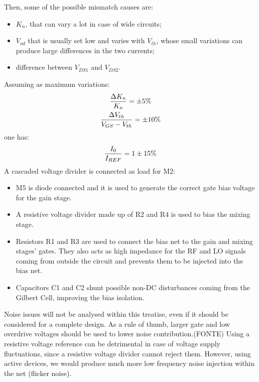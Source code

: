 Then, some of the possible mismatch causes are:
\begin{itemize}
	\item $K_n$, that can vary a lot in case of wide circuits;
	\item $V_{od}$ that is usually set low and varies with $V_{th}$, whose small variations can produce large differences in the two currents;
	\item difference between $V_{DS1}$ and $V_{DS2}$.
\end{itemize}
Assuming as maximum variations:
\begin{gather}
\frac{\Delta K_n}{K_n} = \pm 5 \% \notag \\
\frac{\Delta V_{th}}{V_{GS}-V_{th}} = \pm 10 \% \notag
\end{gather}
one has:
\begin{equation}
\frac{I_0}{I_{REF}} = 1 \pm 15 \% \notag
\end{equation}
A cascaded voltage divider is connected as load for M2: 
\begin{itemize}
	\item M5 is diode connected and it is used to generate the correct gate bias voltage for the gain stage.
	\item A resistive voltage divider made up of R2 and R4 is used to bias the mixing stage.
	\item Resistors R1 and R3 are used to connect the bias net to the gain and mixing stages' gates. They also acts as high impedance for the RF and LO signals coming from outside the circuit and prevents them to be injected into the bias net.
	\item Capacitors C1 and C2 shunt possible non-DC disturbances coming from the Gilbert Cell, improving the bias isolation.
\end{itemize}

Noise issues will not be analysed within this treatise, even if it should be considered for a complete design. As a rule of thumb, larger gate and low overdrive voltages should be used to lower noise contribution.(FONTE) 
Using a resistive voltage reference can be detrimental in case of voltage supply fluctuations, since a resistive voltage divider cannot reject them. However, using active devices, we would produce much more low frequency noise injection within the net (flicker noise).

